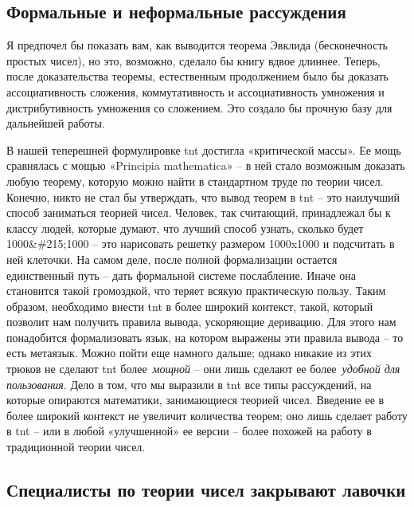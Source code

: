 \documentclass[../main.tex]{subfiles}
\begin{document}
\subsection{Формальные и неформальные рассуждения}

Я предпочел бы показать вам, как выводится теорема Эвклида (бесконечность простых чисел), но это, возможно, сделало бы книгу вдвое длиннее. Теперь, после доказательства теоремы, естественным продолжением было бы доказать ассоциативность сложения, коммутативность и ассоциативность умножения и дистрибутивность умножения со сложением. Это создало бы прочную базу для дальнейшей работы.

В нашей теперешней формулировке \acs{tnt} достигла «критической массы». Ее мощь сравнялась с мощью «Principia mathematica» \--- в ней стало возможным доказать любую теорему, которую можно найти в стандартном труде по теории чисел. Конечно, никто не стал бы утверждать, что вывод теорем в \acs{tnt} \--- это наилучший способ заниматься теорией чисел. Человек, так считающий, принадлежал бы к классу людей, которые думают, что лучший способ узнать, сколько будет 1000\&\#215;1000 \--- это нарисовать решетку размером 1000x1000 и подсчитать в ней клеточки. На самом деле, после полной формализации остается единственный путь \--- дать формальной системе послабление. Иначе она становится такой громоздкой, что теряет всякую практическую пользу. Таким образом, необходимо внести \acs{tnt} в более широкий контекст, такой, который позволит нам получить правила вывода, ускоряющие деривацию. Для этого нам понадобится формализовать язык, на котором выражены эти правила вывода \--- то есть метаязык. Можно пойти еще намного дальше; однако никакие из этих трюков не сделают \acs{tnt} более~\emph{мощной} \--- они лишь сделают ее более~\emph{удобной для пользования}. Дело в том, что мы выразили в \acs{tnt} все типы рассуждений, на которые опираются математики, занимающиеся теорией чисел. Введение ее в более широкий контекст не увеличит количества теорем; оно лишь сделает работу в \acs{tnt} \--- или в любой «улучшенной» ее версии \--- более похожей на работу в традиционной теории чисел.


\subsection{Специалисты по теории чисел закрывают лавочки}
\end{document}
